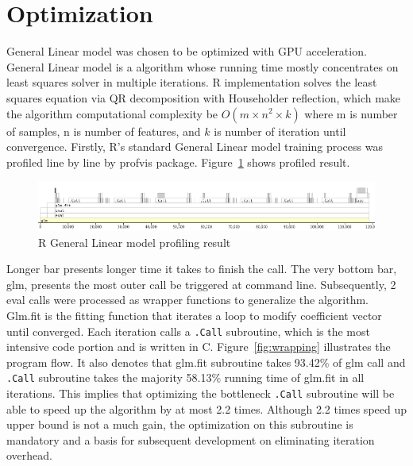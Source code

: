 \documentclass[English]{dicomopapers}
\begin{document}
\section{Optimization}
General Linear model was chosen to be optimized with GPU acceleration. General Linear model is a algorithm whose running time mostly concentrates on least squares solver in multiple iterations. R implementation solves the least squares equation via QR decomposition with Householder reflection, which make the algorithm computational complexity be \(O(m \times n ^ 2 \times k)\) where m is number of samples, n is number of features, and \(k\) is number of iteration until convergence.\newline
Firstly, R's standard General Linear model training process was profiled line by line by profvis package. Figure~\ref{fig:profvis} shows profiled result.\newline
\begin{figure}[ht]
  \centering
  \includegraphics[width=\textwidth/3,natwidth=1021,natheight=151]{profvis.png}
  \caption{R General Linear model profiling result}\label{fig:profvis}
\end{figure}
\newline
Longer bar presents longer time it takes to finish the call. The very bottom bar, glm, presents the most outer call be triggered at command line. Subsequently, 2 eval calls were processed as wrapper functions to generalize the algorithm. Glm.fit is the fitting function that iterates a loop to modify coefficient vector until converged. Each iteration calls a \texttt{.Call} subroutine, which is the most intensive code portion and is written in C. Figure~\ref{fig:wrapping} illustrates the program flow. It also denotes that glm.fit subroutine takes 93.42\% of glm call and \texttt{.Call} subroutine takes the majority 58.13\% running time of glm.fit in all iterations. This implies that optimizing the bottleneck \texttt{.Call} subroutine will be able to speed up the algorithm by at most 2.2 times. Although 2.2 times speed up upper bound is not a much gain, the optimization on this subroutine is mandatory and a basis for subsequent development on eliminating iteration overhead.\newline
\end{document}
